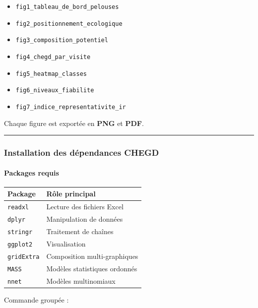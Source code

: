 \begin{itemize}
\tightlist
\item
  \texttt{fig1\_tableau\_de\_bord\_pelouses}
\item
  \texttt{fig2\_positionnement\_ecologique}
\item
  \texttt{fig3\_composition\_potentiel}
\item
  \texttt{fig4\_chegd\_par\_visite}
\item
  \texttt{fig5\_heatmap\_classes}
\item
  \texttt{fig6\_niveaux\_fiabilite}
\item
  \texttt{fig7\_indice\_representativite\_ir}
\end{itemize}

Chaque figure est exportée en \textbf{PNG} et \textbf{PDF}.

\begin{center}\rule{0.5\linewidth}{0.5pt}\end{center}

\subsubsection{Installation des dépendances
CHEGD}\label{installation-des-duxe9pendances-chegd}

\paragraph{Packages requis}\label{packages-requis}

{\def\LTcaptype{none} %
\begin{longtable}[]{@{}ll@{}}
\toprule\noalign{}
Package & Rôle principal \\
\midrule\noalign{}
\endhead
\bottomrule\noalign{}
\endlastfoot
\texttt{readxl} & Lecture des fichiers Excel \\
\texttt{dplyr} & Manipulation de données \\
\texttt{stringr} & Traitement de chaînes \\
\texttt{ggplot2} & Visualisation \\
\texttt{gridExtra} & Composition multi-graphiques \\
\texttt{MASS} & Modèles statistiques ordonnés \\
\texttt{nnet} & Modèles multinomiaux \\
\end{longtable}
}

Commande groupée :

